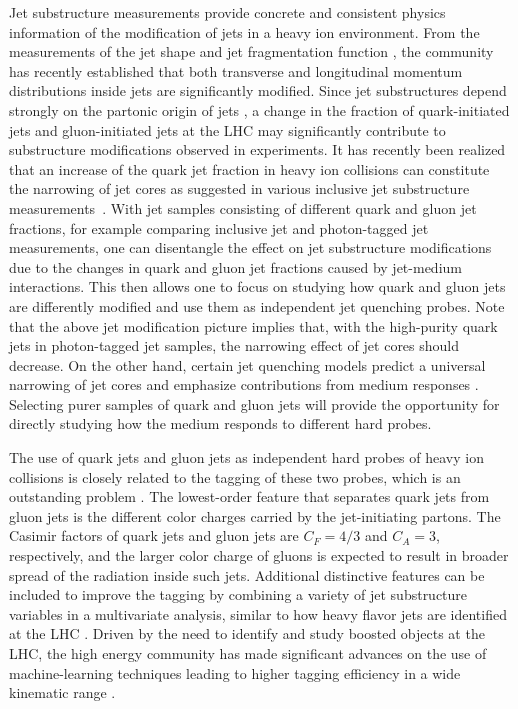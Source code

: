 \documentclass[notoc,preprintnumbers]{JHEP3}
\begin{document}
Jet substructure measurements provide concrete and consistent physics information of the modification of jets in a heavy ion environment. From the measurements of the jet shape \cite{Ellis:1992qq,Chatrchyan:2013kwa,Khachatryan:2016tfj,Seymour:1997kj,Li:2011hy,Li:2012bw,Vitev:2008rz,Vitev:2009rd} and jet fragmentation function \cite{Procura:2009vm,Chatrchyan:2012gw,Aad:2014wha,Chatrchyan:2014ava,Aaboud:2017bzv,Sirunyan:2018qec}, the community has recently established that both transverse and longitudinal momentum distributions inside jets are significantly modified. Since jet substructures depend strongly on the partonic origin of jets \cite{Gallicchio:2011xq,Gallicchio:2012ez,Chien:2012ur,Chien:2015ctp,Chien:2014nsa}, a change in the fraction of quark-initiated jets and gluon-initiated jets at the LHC may significantly contribute to substructure modifications observed in experiments. It has recently been realized that an increase of the quark jet fraction in heavy ion collisions can constitute the narrowing of jet cores as suggested in various inclusive jet substructure measurements~\cite{Chien:2015hda,Spousta:2015fca}. With jet samples consisting of different quark and gluon jet fractions, for example comparing inclusive jet and photon-tagged jet measurements, one can disentangle the effect on jet substructure modifications due to the changes in quark and gluon jet fractions caused by jet-medium interactions. This then allows one to focus on studying how quark and gluon jets are differently modified and use them as independent jet quenching probes. Note that the above jet modification picture implies that, with the high-purity quark jets in photon-tagged jet samples, the narrowing effect of jet cores should decrease. On the other hand, certain jet quenching models predict a universal narrowing of jet cores \cite{KunnawalkamElayavalli:2017hxo,Milhano:2017nzm,Casalderrey-Solana:2016jvj,Brewer:2017fqy} and emphasize contributions from medium responses \cite{Tachibana:2017syd}. Selecting purer samples of quark and gluon jets will provide the opportunity for directly studying how the medium responds to different hard probes.

The use of quark jets and gluon jets as independent hard probes of heavy ion collisions is closely related to the tagging of these two probes, which is an outstanding problem \cite{Gras:2017jty,Frye:2017yrw}. The lowest-order feature that separates quark jets from gluon jets is the different color charges carried by the jet-initiating partons. The Casimir factors of quark jets and gluon jets are $C_F = 4/3$ and $C_A=3$, respectively, and the larger color charge of gluons is expected to result in broader spread of the radiation inside such jets. Additional distinctive features can be included to improve the tagging by combining a variety of jet substructure variables in a multivariate analysis, similar to how heavy flavor jets are identified at the LHC \cite{}. Driven by the need to identify and study boosted objects at the LHC, the high energy community has made significant advances on the use of machine-learning techniques leading to higher tagging efficiency in a wide kinematic range \cite{Komiske:2016rsd, Larkoski:2017jix}.
\end{document}
